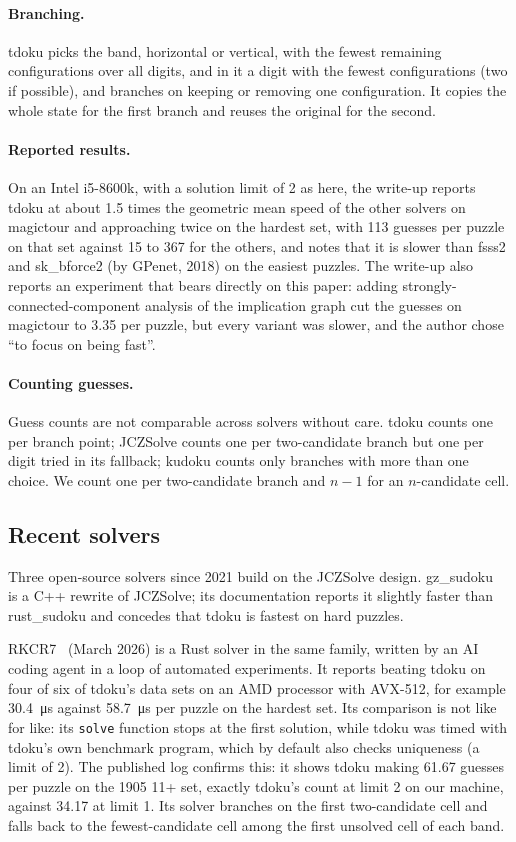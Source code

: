 \documentclass[11pt]{article}
\theoremstyle{definition}
\theoremstyle{plain}
\begin{document}
\paragraph{Branching.} tdoku picks the band, horizontal or vertical, with the fewest remaining configurations over all
digits, and in it a digit with the fewest configurations (two if possible), and branches on keeping or removing one
configuration. It copies the whole state for the first branch and reuses the original for the second.

\paragraph{Reported results.} On an Intel i5-8600k, with a solution limit of 2 as here, the write-up reports tdoku at
about 1.5 times the geometric mean speed of the other solvers on magictour and approaching twice on the hardest set,
with 113 guesses per puzzle on that set against 15 to 367 for the others, and notes that it is slower than fsss2 and
sk\_bforce2 (by GPenet, 2018) on the easiest puzzles. The write-up also reports an experiment that bears directly on
this paper: adding strongly-connected-component analysis of the implication graph cut the guesses on magictour to 3.35
per puzzle, but every variant was slower, and the author chose ``to focus on being fast''.

\paragraph{Counting guesses.} Guess counts are not comparable across solvers without care. tdoku counts one per branch
point; JCZSolve counts one per two-candidate branch but one per digit tried in its fallback; kudoku counts only
branches with more than one choice. We count one per two-candidate branch and $n-1$ for an $n$-candidate cell.

\subsection{Recent solvers}

Three open-source solvers since 2021 build on the JCZSolve design. gz\_sudoku~\cite{shines77_gzsudoku} is a C++ rewrite
of JCZSolve; its documentation reports it slightly faster than rust\_sudoku and concedes that tdoku is fastest on hard
puzzles.

RKCR7~\cite{rkcr7_2026autoresearch} (March 2026) is a Rust solver in the same family, written by an AI coding agent in
a loop of automated experiments. It reports beating tdoku on four of six of tdoku's data sets on an AMD processor with
AVX-512, for example \SI{30.4}{\micro\second} against \SI{58.7}{\micro\second} per puzzle on the hardest set. Its comparison is not like for like: its
\texttt{solve} function stops at the first solution, while tdoku was timed with tdoku's own benchmark program, which by
default also checks uniqueness (a limit of 2). The published log confirms this: it shows tdoku making 61.67 guesses per
puzzle on the 1905 11+ set, exactly tdoku's count at limit 2 on our machine, against 34.17 at limit 1. Its solver
branches on the first two-candidate cell and falls back to the fewest-candidate cell among the first unsolved cell of
each band.
\end{document}
